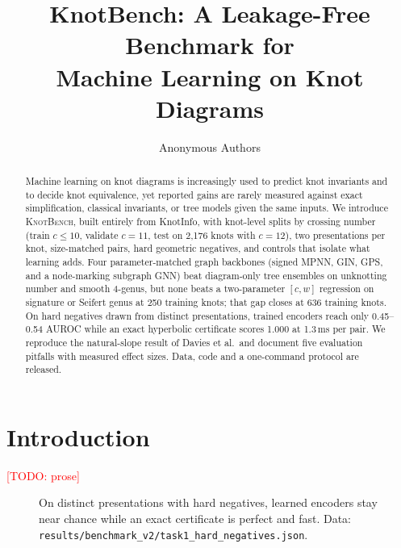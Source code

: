 \documentclass{article}
\title{KnotBench: A Leakage-Free Benchmark for\\Machine Learning on Knot Diagrams}
\author{Anonymous Authors}  %
\newcommand{\todo}[1]{\textcolor{red}{[TODO: #1]}}
\begin{document}
\maketitle

\begin{abstract}
Machine learning on knot diagrams is increasingly used to predict knot
invariants and to decide knot equivalence, yet reported gains are rarely
measured against exact simplification, classical invariants, or tree models
given the same inputs. We introduce \textsc{KnotBench}, built entirely from
KnotInfo, with knot-level splits by crossing number (train $c{\le}10$,
validate $c{=}11$, test on 2{,}176 knots with $c{=}12$), two presentations per
knot, size-matched pairs, hard geometric negatives, and controls that isolate
what learning adds. Four parameter-matched graph backbones (signed MPNN, GIN,
GPS, and a node-marking subgraph GNN) beat diagram-only tree ensembles on
unknotting number and smooth 4-genus, but none beats a two-parameter
$[c,w]$ regression on signature or Seifert genus at 250 training knots; that
gap closes at 636 training knots. On hard negatives drawn from distinct
presentations, trained encoders reach only 0.45--0.54 AUROC while an exact
hyperbolic certificate scores 1.000 at 1.3\,ms per pair. We reproduce the
natural-slope result of Davies et al.\ and document five evaluation pitfalls
with measured effect sizes. Data, code and a one-command protocol are released.
\end{abstract}

\section{Introduction}\label{sec:intro}
\todo{prose}

\begin{figure}[t]
  \centering
  \caption{On distinct presentations with hard negatives, learned encoders stay
  near chance while an exact certificate is perfect and fast. Data:
  \texttt{results/benchmark\_v2/task1\_hard\_negatives.json}.}
  \label{fig:teaser}
\end{figure}
\end{document}
